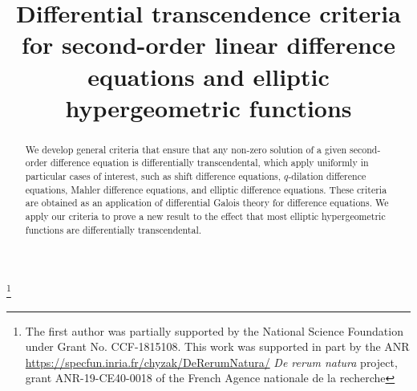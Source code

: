 \documentclass[JEP,XML,SOM,Unicode]{cedram}
\theoremstyle{definition}
\begin{document}
\frontmatter
\title[Diff.\ transc.\ criteria \& elliptic hypergeometric functions]{Differential transcendence criteria for second-order linear difference equations and elliptic hypergeometric functions}

\author[\initial{C.} \middlename {E.} \lastname{Arreche}]{  }
\address{The University of Texas at Dallas, Mathematical Sciences FO 35\\
800 West Campbell Road, Richardson, TX 75024, USA}

\author[\initial{T.} \lastname{Dreyfus}]{ }
\address{Institut de Recherche Mathématique Avancée, U.M.R. 7501 Université de Strasbourg et C.N.R.S.\\
7, rue René Descartes 67084 Strasbourg, France}

\author[\initial{J.} \lastname{Roques}]{ }
\address{Univ Lyon, Université Claude Bernard Lyon 1, CNRS UMR 5208, Institut Camille Jordan\\
43 blvd. du 11 novembre 1918, F-69622 Villeurbanne cedex, France}

\thanks{The first author was partially supported by the National Science Foundation under Grant No. CCF-1815108. This work was supported in part by the ANR \url{https://specfun.inria.fr/chyzak/DeRerumNatura/} \emph{De rerum natura} project, grant ANR-19-CE40-0018 of the French Agence nationale de la recherche}

\begin{abstract}
We develop general criteria that ensure that any non-zero solution of a given second-order difference equation is differentially transcendental, which apply uniformly in particular cases of interest, such as shift difference equations, $q$-dilation difference equations, Mahler difference equations, and elliptic difference equations. These criteria are obtained as an application of differential Galois theory for difference equations. We apply our criteria to prove a new result to the effect that most elliptic hypergeometric functions are differentially transcendental.
\end{abstract}


\end{document}
